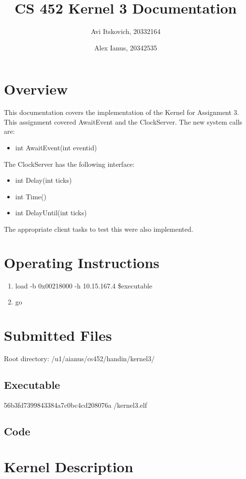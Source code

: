 \documentclass{article}
\title{CS 452 Kernel 3 Documentation}
\author{
  Avi Itskovich, 20332164
  \and
  Alex Ianus, 20342535
}
\begin{document}
\maketitle

\section{Overview}

This documentation covers the implementation of the Kernel for Assignment 3. This assignment covered AwaitEvent and the ClockServer. The new system calls are: 
\begin{itemize}
  \item int AwaitEvent(int eventid)
\end{itemize}
The ClockServer has the following interface:
\begin{itemize}
  \item int Delay(int ticks)
  \item int Time()
  \item int DelayUntil(int ticks)
\end{itemize}
The appropriate client tasks to test this were also implemented.

\section{Operating Instructions}
\begin{enumerate}
  \item load -b 0x00218000 -h 10.15.167.4 \$executable
  \item go
\end{enumerate}

\section{Submitted Files}
Root directory: /u1/aianus/cs452/handin/kernel3/

\subsection{Executable}
56b3fd7399843384a7c0bc4cd208076a  /kernel3.elf
\subsection{Code}

\section{Kernel Description}
\end{document}
